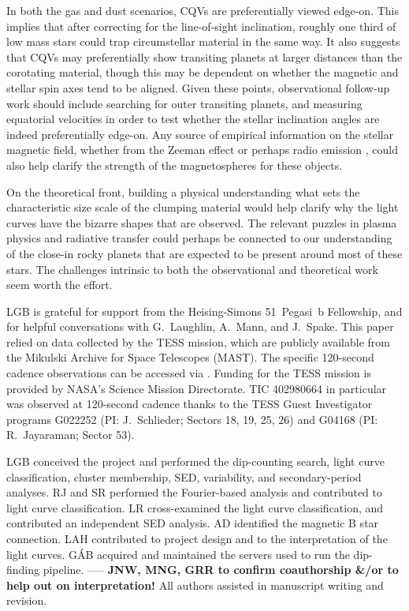 \documentclass[11pt,twocolumn,tighten]{aastex63}
\begin{document}
In both the gas and dust scenarios, CQVs are preferentially viewed
edge-on.  This implies that after correcting for the line-of-sight
inclination, roughly one third of low mass stars \citep[those that
rotate rapidly enough;][]{2022AJ....163..144G} could trap circumstellar
material in the same way.  It also suggests that CQVs may
preferentially show transiting planets at larger distances than the
corotating material, though this may be dependent on whether the
magnetic and stellar spin axes tend to be aligned.  Given these
points, observational follow-up work should include searching for
outer transiting planets, and measuring equatorial velocities in order
to test whether the stellar inclination angles are indeed
preferentially edge-on.  Any source of empirical information on the
stellar magnetic field, whether from the Zeeman effect
\citep[e.g.][]{2021A&ARv..29....1K} or perhaps radio emission
\citep[e.g.][]{2015Natur.523..568H}, could also help clarify the
strength of the magnetospheres for these objects.

On the theoretical front, building a physical understanding what sets
the characteristic size scale of the clumping material would help
clarify why the light curves have the bizarre shapes that are
observed.  The relevant puzzles in plasma physics and radiative
transfer could perhaps be connected to our understanding of the
close-in rocky planets that are expected to be present around most of
these stars.  The challenges intrinsic to both the observational and
theoretical work seem worth the effort.



\acknowledgments
LGB is grateful for support from the Heising-Simons 51~Pegasi~b
Fellowship, and for helpful conversations with G.~Laughlin, A.~Mann,
and J.~Spake.  This paper relied on data collected by the TESS
mission, which are publicly available from the Mikulski Archive for
Space Telescopes (MAST).  The specific 120-second cadence observations
can be accessed via
.  Funding for the
TESS mission is provided by NASA’s Science Mission Directorate.  TIC
402980664 in particular was observed at 120-second cadence thanks to
the TESS Guest Investigator programs G022252 (PI: J.~Schlieder;
Sectors 18, 19, 25, 26) and G04168 (PI: R.~Jayaraman; Sector 53).


LGB conceived the project and performed the dip-counting search, light curve classification, cluster membership, SED, variability, and secondary-period analyses.
RJ and SR performed the Fourier-based analysis and contributed to light curve classification.
LR cross-examined the light curve classification, and contributed an independent SED analysis.
AD identified the magnetic B star connection.
LAH contributed to project design and to the interpretation of the light curves.
G\'AB acquired and maintained the servers used to run the dip-finding pipeline.
-----
{\bf JNW, MNG, GRR to confirm coauthorship \&/or to help out on interpretation!}
All authors assisted in manuscript writing and revision.
\end{document}
